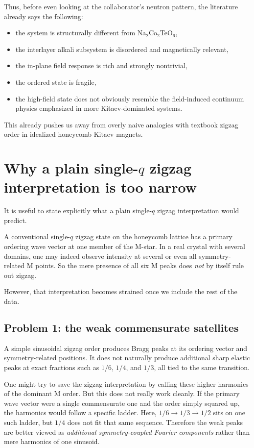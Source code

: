 \documentclass[11pt]{article}
\begin{document}
Thus, before even looking at the collaborator's neutron pattern, the literature already says the following:
\begin{itemize}[leftmargin=2em,itemsep=0.35em]
    \item the system is structurally different from Na$_2$Co$_2$TeO$_6$,
    \item the interlayer alkali subsystem is disordered and magnetically relevant,
    \item the in-plane field response is rich and strongly nontrivial,
    \item the ordered state is fragile,
    \item the high-field state does not obviously resemble the field-induced continuum physics emphasized in more Kitaev-dominated systems.
\end{itemize}

This already pushes us away from overly naive analogies with textbook zigzag order in idealized honeycomb Kitaev magnets.

\section{Why a plain single-$q$ zigzag interpretation is too narrow}

It is useful to state explicitly what a plain single-$q$ zigzag interpretation would predict.

A conventional single-$q$ zigzag state on the honeycomb lattice has a primary ordering wave vector at one member of the M-star. In a real crystal with several domains, one may indeed observe intensity at several or even all symmetry-related M points. So the mere presence of all six M peaks does \emph{not} by itself rule out zigzag.

However, that interpretation becomes strained once we include the rest of the data.

\subsection{Problem 1: the weak commensurate satellites}

A simple sinusoidal zigzag order produces Bragg peaks at its ordering vector and symmetry-related positions. It does not naturally produce additional sharp elastic peaks at exact fractions such as \(1/6\), \(1/4\), and \(1/3\), all tied to the same transition.

One might try to save the zigzag interpretation by calling these higher harmonics of the dominant M order. But this does not really work cleanly. If the primary wave vector were a single commensurate one and the order simply squared up, the harmonics would follow a specific ladder. Here, \(1/6\to 1/3\to 1/2\) sits on one such ladder, but \(1/4\) does not fit that same sequence. Therefore the weak peaks are better viewed as \emph{additional symmetry-coupled Fourier components} rather than mere harmonics of one sinusoid.
\end{document}
